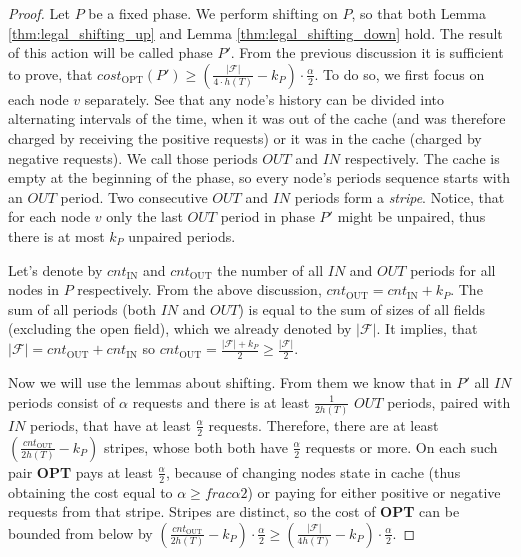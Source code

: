 \begin{proof}
Let $P$ be a fixed phase. We perform shifting on $P$, so that both Lemma 
\ref{thm:legal_shifting_up} and Lemma \ref{thm:legal_shifting_down} hold. The 
result of this action will be called phase $P'$. From the previous discussion 
it is sufficient to prove, that $cost_{\mathrm{OPT}}(P') \geq 
(\frac{|\mathcal{F}|}{4 
\cdot h(T)}-k_P) \cdot \frac{\alpha}{2}$. To do so, we first focus on each 
node $v$ separately. See that any node's history can be divided into 
alternating intervals of the time, when it was out of the cache (and was 
therefore charged by receiving the positive requests) or it was in the cache 
(charged by negative requests). We call those 
periods $OUT$ and $IN$ respectively. The cache is empty at the beginning of the 
phase, so every node's periods sequence starts with an $OUT$ period. Two 
consecutive $OUT$ and $IN$ periods form a \textit{stripe}. Notice, that for 
each node $v$ only the last 
$OUT$ period in phase $P'$ might be unpaired, thus there is at most $k_P$ 
unpaired periods.

Let's denote by $cnt_{\mathrm{IN}}$ and $cnt_{\mathrm{OUT}}$ the number of all 
$IN$ and $OUT$ 
periods for all nodes in $P$  respectively. From the above discussion, 
$cnt_{\mathrm{OUT}} = cnt_{\mathrm{IN}} + k_P$. The sum of all periods (both 
$IN$ and $OUT$) is equal to the sum of sizes 
of all fields (excluding the open field), which we already denoted by 
$|\mathcal{F}|$. It implies, that 
$|\mathcal{F}| = cnt_{\mathrm{OUT}} + cnt_{\mathrm{IN}}$ so 
$cnt_{\mathrm{OUT}} = 
\frac{|\mathcal{F}| + k_P}{2} \geq \frac{|\mathcal{F}|}{2}.$

Now we will use the lemmas about shifting. From them we know that in $P'$ all 
$IN$ periods consist of $\alpha$ requests and there is at least 
$\frac{1}{2h(T)}$ $OUT$ periods, paired with $IN$ periods, that have 
at least $\frac{\alpha}{2}$ requests. Therefore, there are at least 
$(\frac{cnt_{\mathrm{OUT}}}{2h(T)} - k_P)$ stripes, whose both 
both 
have $\frac{\alpha}{2}$ requests or more. On each such pair \textbf{OPT} pays 
at least $\frac{\alpha}{2}$, because of changing nodes state in cache (thus 
obtaining the cost equal to $\alpha \geq frac{\alpha}{2}$) or paying for either 
positive or negative requests from that stripe. 
Stripes are distinct, so the cost of \textbf{OPT} can be bounded from below by 
$(\frac{cnt_{\mathrm{OUT}}}{2h(T)} - k_P) \cdot \frac{\alpha}{2} \geq 
(\frac{|\mathcal{F}|}{4h(T)} - k_P) \cdot  \frac{\alpha}{2}$.
\end{proof}

